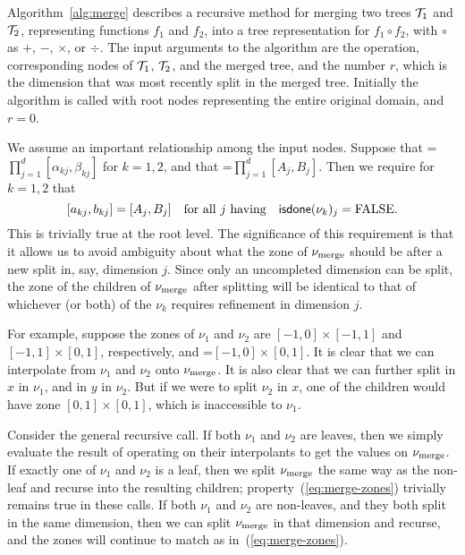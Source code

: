 %
%
\label{sec:merge}

Algorithm~\ref{alg:merge} describes a recursive method for merging two trees $\mathcal{T}_1$ and $\mathcal{T}_2$, representing functions $f_1$ and $f_2$, into a tree representation for $f_1\circ f_2$, with $\circ$ as $+$, $-$, $\times$, or $\div$. The input arguments to the algorithm are the operation, corresponding nodes of $\mathcal{T}_1$, $\mathcal{T}_2$, and the merged tree, and the number $r$, which is the dimension that was most recently split in the merged tree. Initially the algorithm is called with root nodes representing the entire original domain, and $r=0$. 

We assume an important relationship among the input nodes. Suppose that =$\prod_{j=1}^d [\alpha_{kj},\beta_{kj}]$ for $k=1,2$, and that =$\prod_{j=1}^d [A_{j},B_{j}]$. Then we require for $k=1,2$ that
\begin{equation}
  \label{eq:merge-zones}
  [a_{kj},b_{kj}]=[A_j,B_j] \quad \text{for all $j$ having} \quad   \textsf{isdone}(\nu_k)_j=
  \text{FALSE}.
\end{equation}
This is trivially true at the root level. The significance of this requirement is that it allows us to avoid ambiguity about what the zone of $\nu_\text{merge}$ should be after a new split in, say, dimension $j$. Since only an uncompleted dimension can be split, the zone of the children of $\nu_\text{merge}$ after splitting will be identical to that of whichever (or both) of the $\nu_k$ requires refinement in dimension $j$.

For example, suppose the zones of $\nu_1$ and $\nu_2$ are $[-1,0]\times[-1,1]$ and $[-1,1]\times[0,1]$, respectively, and =$[-1,0]\times[0,1]$. It is clear that we can interpolate from $\nu_1$ and $\nu_2$ onto $\nu_\text{merge}$. It is also clear that we can further split in $x$ in $\nu_1$, and in $y$ in $\nu_2$. But if we were to split $\nu_2$ in $x$, one of the children would have zone $[0,1]\times[0,1]$, which is inaccessible to $\nu_1$. 

Consider the general recursive call. If both $\nu_1$ and $\nu_2$ are leaves, then we simply evaluate the result of operating on their interpolants to get the values on $\nu_\text{merge}$. If exactly one of $\nu_1$ and $\nu_2$ is a leaf, then we split $\nu_\text{merge}$ the same way as the non-leaf and recurse into the resulting children; property~(\ref{eq:merge-zones}) trivially remains true in these calls. If both  $\nu_1$ and $\nu_2$ are non-leaves, and they both split in the same dimension, then we can split $\nu_\text{merge}$ in that dimension and recurse, and the zones will continue to match as in~(\ref{eq:merge-zones}).

